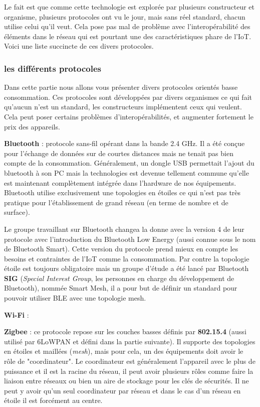 Le fait est que comme cette technologie est explorée par plusieurs constructeur et organisme, plusieurs protocoles ont vu le jour, mais sans réel standard, chacun utilise celui qu'il veut. Cela pose pas mal de problème avec l'interopérabilité des éléments dans le réseau qui est pourtant une des caractéristiques phare de l'IoT. Voici une liste succincte de ces divers protocoles.

\subsubsection{les différents protocoles}

Dans cette partie nous allons vous présenter divers protocoles orientés basse consommation. Ces protocoles sont développées par divers organismes ce qui fait qu'aucun n'est un standard, les constructeurs implémentent ceux qui veulent. Cela peut poser certains problèmes d'interopérabilités, et augmenter fortement le prix des appareils.

\textbf{Bluetooth} : protocole sans-fil opérant dans la bande 2.4 GHz. Il a été conçue pour l'échange de données sur de courtes distances mais ne tenait pas bien compte de la consommation. Généralement, un dongle USB permettait l'ajout du bluetooth à son PC mais la technologies est devenue tellement commune qu'elle est maintenant complètement intégrée dans l'hardware de nos équipements. Bluetooth utilise exclusivement une topologies en étoiles ce qui n'est pas très pratique pour l'établissement de grand réseau (en terme de nombre et de surface).

Le groupe travaillant sur Bluetooth changea la donne avec la version 4 de leur protocole avec l'introduction du Bluetooth Low Energy (aussi connue sous le nom de Bluetooth Smart). Cette version du protocole prend mieux en compte les besoins et contraintes de l'IoT comme la consommation. Par contre la topologie étoile est toujours obligatoire mais un groupe d'étude a été lancé par Bluetooth \textbf{SIG} (\textit{Special Interest Group}, les personnes en charge du développement de Bluetooth), nommée Smart Mesh, il a pour but de définir un standard pour pouvoir utiliser BLE avec une topologie mesh.

\textbf{Wi-Fi} :

\textbf{Zigbee} : ce protocole repose sur les couches basses définis par \textbf{802.15.4} (aussi utilisé par 6LoWPAN et défini dans la partie suivante). Il supporte des topologies en étoiles et maillées (\textit{mesh}), mais pour cela, un des équipements doit avoir le rôle de "coordinateur". Le coordinateur est généralement l'appareil avec le plus de puissance et il est la racine du réseau, il peut avoir plusieurs rôles comme faire la liaison entre réseaux ou bien un aire de stockage pour les clés de sécurités. Il ne peut y avoir qu'un seul coordinateur par réseau et dans le cas d'un réseau en étoile il est forcément au centre.

